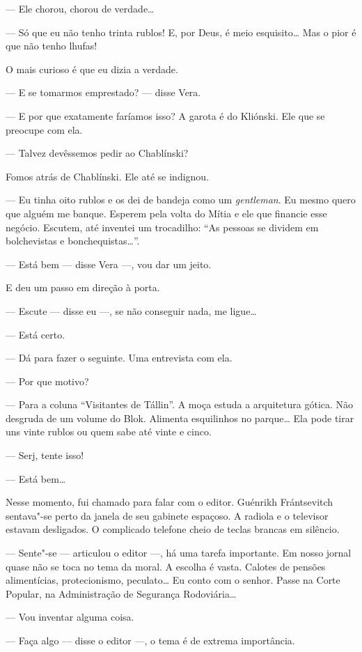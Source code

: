 --- Ele chorou, chorou de verdade\ldots{}

--- Só que eu não tenho trinta rublos! E, por Deus, é meio esquisito\ldots{}
Mas o pior é que não tenho lhufas!

O mais curioso é que eu dizia a verdade.

--- E se tomarmos emprestado? --- disse Vera.

--- E por que exatamente faríamos isso? A garota é do Kliónski. Ele que
se preocupe com ela.

--- Talvez devêssemos pedir ao Chablínski?

Fomos atrás de Chablínski. Ele até se indignou.

--- Eu tinha oito rublos e os dei de bandeja como um \emph{gentleman}.
Eu mesmo quero que alguém me banque. Esperem pela volta do Mítia e ele
que financie esse negócio. Escutem, até inventei um trocadilho: ``As
pessoas se dividem em bolchevistas e bonchequistas\ldots{}''.

--- Está bem --- disse Vera ---, vou dar um jeito.

E deu um passo em direção à porta.

--- Escute --- disse eu ---, se não conseguir nada, me ligue\ldots{}

--- Está certo.

--- Dá para fazer o seguinte. Uma entrevista com ela.

--- Por que motivo?

--- Para a coluna ``Visitantes de Tállin''. A moça estuda a arquitetura
gótica. Não desgruda de um volume do Blok. Alimenta esquilinhos no
parque\ldots{} Ela pode tirar uns vinte rublos ou quem sabe até vinte e
cinco.

--- Serj, tente isso!

--- Está bem\ldots{}

Nesse momento, fui chamado para falar com o editor. Guénrikh
Frántsevitch sentava"-se perto da janela de seu gabinete espaçoso. A
radiola e o televisor estavam desligados. O complicado telefone cheio de
teclas brancas em silêncio.

--- Sente"-se --- articulou o editor ---, há uma tarefa importante. Em
nosso jornal quase não se toca no tema da moral. A escolha é vasta.
Calotes de pensões alimentícias, protecionismo, peculato\ldots{} Eu conto com o senhor. Passe na Corte Popular, na
Administração de Segurança Rodoviária\ldots{}

--- Vou inventar alguma coisa.

--- Faça algo --- disse o editor ---, o tema é de extrema importância.

